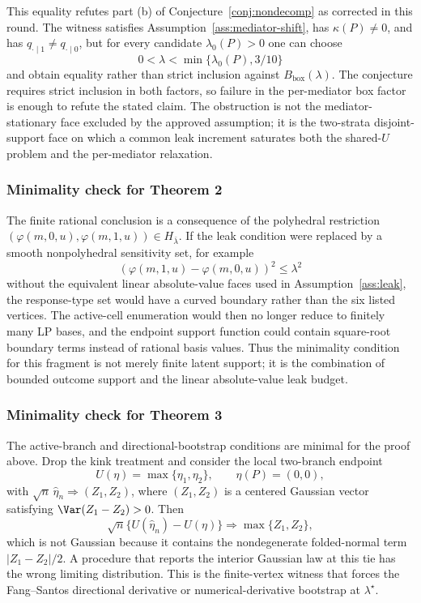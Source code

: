 \documentclass[11pt]{article}
\theoremstyle{definition}
\theoremstyle{plain}
\theoremstyle{remark}
\begin{document}
This equality refutes part (b) of Conjecture~\ref{conj:nondecomp} as corrected in
this round. The witness satisfies Assumption~\ref{ass:mediator-shift}, has
\(\kappa(P)\neq0\), and has \(q_{\cdot\mid1}\neq q_{\cdot\mid0}\), but for every
candidate \(\lambda_0(P)>0\) one can choose
\[
  0<\lambda<\min\{\lambda_0(P),3/10\}
\]
and obtain equality rather than strict inclusion against \(B_{\mathrm{box}}(\lambda)\).
The conjecture requires strict inclusion in both factors, so failure in the
per-mediator box factor is enough to refute the stated claim. The obstruction is
not the mediator-stationary face excluded by the approved assumption; it is the
two-strata disjoint-support face on which a common leak increment saturates both
the shared-\(U\) problem and the per-mediator relaxation.

\subsubsection*{Minimality check for Theorem 2}
The finite rational conclusion is a consequence of the polyhedral restriction
\((\varphi(m,0,u),\varphi(m,1,u))\in H_{\bar\lambda}\). If the leak condition were replaced by a smooth
nonpolyhedral sensitivity set, for example
\[
  (\varphi(m,1,u)-\varphi(m,0,u))^2\le \lambda^2
\]
without the equivalent linear absolute-value faces used in Assumption~\ref{ass:leak}, the response-type set
would have a curved boundary rather than the six listed vertices. The active-cell enumeration would then no
longer reduce to finitely many LP bases, and the endpoint support function could contain square-root boundary
terms instead of rational basis values. Thus the minimality condition for this fragment is not merely finite
latent support; it is the combination of bounded outcome support and the linear absolute-value leak budget.

\subsubsection*{Minimality check for Theorem 3}
The active-branch and directional-bootstrap conditions are minimal for the proof above.
Drop the kink treatment and consider the local two-branch endpoint
\[
  U(\eta)=\max\{\eta_1,\eta_2\},\qquad \eta(P)=(0,0),
\]
with \(\sqrt n\,\widehat\eta_n\Rightarrow (Z_1,Z_2)\), where
\((Z_1,Z_2)\) is a centered Gaussian vector satisfying
\(\Var(Z_1-Z_2)>0\).  Then
\[
  \sqrt n\{U(\widehat\eta_n)-U(\eta)\}
  \Rightarrow
  \max\{Z_1,Z_2\},
\]
which is not Gaussian because it contains the nondegenerate folded-normal term
\(|Z_1-Z_2|/2\).  A
procedure that reports the interior Gaussian law at this tie has the wrong limiting
distribution.  This is the finite-vertex witness that forces the
Fang--Santos directional derivative or numerical-derivative bootstrap at
\(\lambda^\star\).
\end{document}
